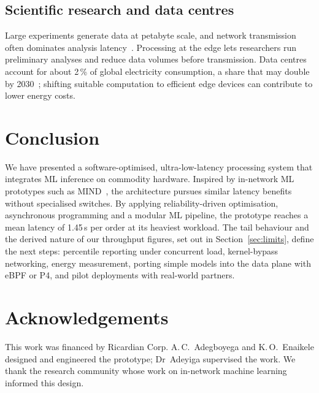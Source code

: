 \documentclass[10pt,a4paper,twocolumn]{article}
\newcommand{\us}{\,\textmu s}
\begin{document}
\subsection{Scientific research and data centres}
Large experiments generate data at petabyte scale, and network transmission often dominates
analysis latency~\cite{ornl}. Processing at the edge lets researchers run preliminary
analyses and reduce data volumes before transmission. Data centres account for about 2\,\%
of global electricity consumption, a share that may double by 2030~\cite{deloitte}; shifting
suitable computation to efficient edge devices can contribute to lower energy costs.

\section{Conclusion}\label{sec:conclusion}
We have presented a software-optimised, ultra-low-latency processing system that integrates
ML inference on commodity hardware. Inspired by in-network ML prototypes such as
MIND~\cite{mind}, the architecture pursues similar latency benefits without specialised
switches. By applying reliability-driven optimisation, asynchronous programming and a
modular ML pipeline, the prototype reaches a mean latency of 1.45\us{} per order at its
heaviest workload. The tail behaviour and the derived nature of our throughput figures,
set out in Section~\ref{sec:limits}, define the next steps: percentile reporting under
concurrent load, kernel-bypass networking, energy measurement, porting simple models into
the data plane with eBPF or P4, and pilot deployments with real-world partners.

\section*{Acknowledgements}
This work was financed by Ricardian Corp. A.\,C.~Adegboyega and K.\,O.~Enaikele designed and
engineered the prototype; Dr~Adeyiga supervised the work. We thank the research community
whose work on in-network machine learning informed this design.
\end{document}

